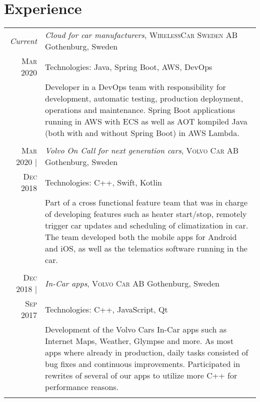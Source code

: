 \documentclass[a4paper,10pt]{scrartcl} %
\begin{document}
\section{Experience}
\begin{tabular}{r|p{15cm}}


\emph{Current} 	                    & \emph{Cloud for car manufacturers}, \textsc{WirelessCar Sweden AB} \hfill Gothenburg, Sweden \\
\textsc{Mar 2020}                   & \footnotesize{Technologies: Java, Spring Boot, AWS, DevOps} \\
\phantom{abcdefghijklm}             & \footnotesize{Developer in a DevOps team with responsibility for development, automatic testing, production deployment, operations and maintenance. Spring Boot applications running in AWS with ECS as well as AOT kompiled Java (both with and without Spring Boot) in AWS Lambda.} \\
\multicolumn{2}{c}{} \\


\textsc{Mar 2020} |	                & \emph{Volvo On Call for next generation cars}, \textsc{Volvo Car AB} \hfill Gothenburg, Sweden \\
\textsc{Dec 2018}                   & \footnotesize{Technologies: C++, Swift, Kotlin} \\
\phantom{abcdefghijklm}             & \footnotesize{
Part of a cross functional feature team that was in charge of developing features such as heater start/stop, remotely trigger car updates and scheduling of climatization in car. The team developed both the mobile apps for Android and iOS, as well as the telematics software running in the car. } \\
\multicolumn{2}{c}{} \\


\textsc{Dec 2018} | 	            & \emph{In-Car apps}, \textsc{Volvo Car AB} \hfill Gothenburg, Sweden \\
\textsc{Sep 2017}                   & \footnotesize{Technologies: C++, JavaScript, Qt} \\
\phantom{abcdefghijklm}             & \footnotesize{
Development of the Volvo Cars In-Car apps such as Internet Maps, Weather, Glympse and more. As most apps where already in production, daily tasks consisted of bug fixes and continuous improvements. Participated in rewrites of several of our apps to utilize more C++ for performance reasons. } \\
\multicolumn{2}{c}{} \\


\end{tabular}
\end{document}
